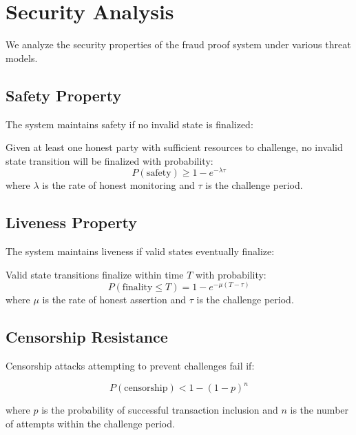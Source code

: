\section{Security Analysis}


We analyze the security properties of the fraud proof system under various threat models.

\subsection{Safety Property}

The system maintains safety if no invalid state is finalized:

\begin{theorem}[Safety]
Given at least one honest party with sufficient resources to challenge, no invalid state transition will be finalized with probability:
\begin{equation}
P(\text{safety}) \geq 1 - e^{-\lambda \tau}
\end{equation}
where $\lambda$ is the rate of honest monitoring and $\tau$ is the challenge period.
\end{theorem}

\subsection{Liveness Property}

The system maintains liveness if valid states eventually finalize:

\begin{theorem}[Liveness]
Valid state transitions finalize within time $T$ with probability:
\begin{equation}
P(\text{finality} \leq T) = 1 - e^{-\mu(T-\tau)}
\end{equation}
where $\mu$ is the rate of honest assertion and $\tau$ is the challenge period.
\end{theorem}

\subsection{Censorship Resistance}

Censorship attacks attempting to prevent challenges fail if:

\begin{equation}
P(\text{censorship}) < 1 - (1 - p)^n
\end{equation}

where $p$ is the probability of successful transaction inclusion and $n$ is the number of attempts within the challenge period.

